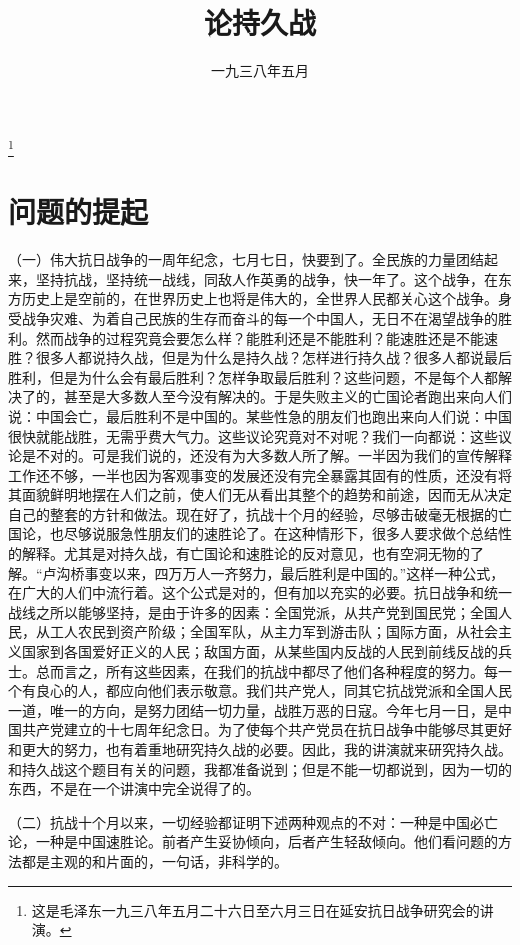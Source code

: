 
\title{论持久战}
\date{一九三八年五月}
\thanks{这是毛泽东一九三八年五月二十六日至六月三日在延安抗日战争研究会的讲演。}
\maketitle


\section{问题的提起}

（一）伟大抗日战争的一周年纪念，七月七日，快要到了。全民族的力量团结起来，坚持抗战，坚持统一战线，同敌人作英勇的战争，快一年了。这个战争，在东方历史上是空前的，在世界历史上也将是伟大的，全世界人民都关心这个战争。身受战争灾难、为着自己民族的生存而奋斗的每一个中国人，无日不在渴望战争的胜利。然而战争的过程究竟会要怎么样？能胜利还是不能胜利？能速胜还是不能速胜？很多人都说持久战，但是为什么是持久战？怎样进行持久战？很多人都说最后胜利，但是为什么会有最后胜利？怎样争取最后胜利？这些问题，不是每个人都解决了的，甚至是大多数人至今没有解决的。于是失败主义的亡国论者跑出来向人们说：中国会亡，最后胜利不是中国的。某些性急的朋友们也跑出来向人们说：中国很快就能战胜，无需乎费大气力。这些议论究竟对不对呢？我们一向都说：这些议论是不对的。可是我们说的，还没有为大多数人所了解。一半因为我们的宣传解释工作还不够，一半也因为客观事变的发展还没有完全暴露其固有的性质，还没有将其面貌鲜明地摆在人们之前，使人们无从看出其整个的趋势和前途，因而无从决定自己的整套的方针和做法。现在好了，抗战十个月的经验，尽够击破毫无根据的亡国论，也尽够说服急性朋友们的速胜论了。在这种情形下，很多人要求做个总结性的解释。尤其是对持久战，有亡国论和速胜论的反对意见，也有空洞无物的了解。“卢沟桥事变以来，四万万人一齐努力，最后胜利是中国的。”这样一种公式，在广大的人们中流行着。这个公式是对的，但有加以充实的必要。抗日战争和统一战线之所以能够坚持，是由于许多的因素：全国党派，从共产党到国民党；全国人民，从工人农民到资产阶级；全国军队，从主力军到游击队；国际方面，从社会主义国家到各国爱好正义的人民；敌国方面，从某些国内反战的人民到前线反战的兵士。总而言之，所有这些因素，在我们的抗战中都尽了他们各种程度的努力。每一个有良心的人，都应向他们表示敬意。我们共产党人，同其它抗战党派和全国人民一道，唯一的方向，是努力团结一切力量，战胜万恶的日寇。今年七月一日，是中国共产党建立的十七周年纪念日。为了使每个共产党员在抗日战争中能够尽其更好和更大的努力，也有着重地研究持久战的必要。因此，我的讲演就来研究持久战。和持久战这个题目有关的问题，我都准备说到；但是不能一切都说到，因为一切的东西，不是在一个讲演中完全说得了的。

（二）抗战十个月以来，一切经验都证明下述两种观点的不对：一种是中国必亡论，一种是中国速胜论。前者产生妥协倾向，后者产生轻敌倾向。他们看问题的方法都是主观的和片面的，一句话，非科学的。

